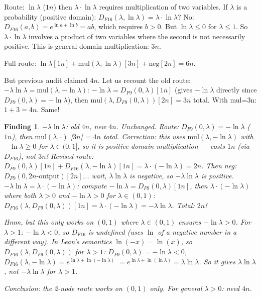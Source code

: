 \documentclass[11pt]{article}
\newtheorem{finding}[theorem]{Finding}
\newcommand{\ok}[1]{\textcolor{ok}{#1}}
\begin{document}
Route: $\ln \lambda$ ($1n$) then $\lambda \cdot \ln \lambda$ requires multiplication of two variables.
If $\lambda$ is a probability (positive domain): $D_{F16}(\lambda, \ln\lambda) = \lambda \cdot \ln\lambda$?
No: $D_{F16}(a,b) = e^{\ln a + \ln b} = ab$, which requires $b > 0$. But $\ln\lambda \leq 0$ for $\lambda \leq 1$.
So $\lambda \cdot \ln\lambda$ involves a product of two variables where the second is not necessarily positive.
This is general-domain multiplication: $3n$.

Full route: $\ln\lambda[1n] + \mathrm{mul}(\lambda, \ln\lambda)[3n] + \mathrm{neg}[2n] = 6n$.

But previous audit claimed $4n$. Let us recount the old route:
$-\lambda\ln\lambda = \mathrm{mul}(\lambda, -\ln\lambda)$: $-\ln\lambda = D_{F9}(0,\lambda)[1n]$ (gives $-\ln\lambda$ directly since $D_{F9}(0,\lambda) = -\ln\lambda$), then $\mathrm{mul}(\lambda, D_{F9}(0,\lambda))[2n] = 3n$ total. With mul=3n: $1+3 = 4n$. \ok{Same!}

\begin{finding}
$-\lambda\ln\lambda$: old $4n$, new $4n$. \ok{Unchanged.}
Route: $D_{F9}(0,\lambda) = -\ln\lambda$ ($1n$), then $\mathrm{mul}(\lambda, \cdot)$ [$3n$] = $4n$ total.
Correction: this uses $\mathrm{mul}(\lambda, -\ln\lambda)$ with $-\ln\lambda \geq 0$ for $\lambda \in (0,1]$,
so it \emph{is} positive-domain multiplication --- costs $1n$ (via $D_{F16}$), not $3n$!
Revised route: $D_{F9}(0,\lambda)[1n] + D_{F16}(\lambda, -\ln\lambda)[1n] = \lambda \cdot (-\ln\lambda) = 2n$.
Then neg: $D_{F9}(0, 2n\text{-output})[2n]$... wait, $\lambda \ln\lambda$ is negative, so $-\lambda\ln\lambda$ is positive.
$-\lambda\ln\lambda = \lambda \cdot (-\ln\lambda)$: compute $-\ln\lambda = D_{F9}(0,\lambda)[1n]$,
then $\lambda \cdot (-\ln\lambda)$ where both $\lambda > 0$ and $-\ln\lambda > 0$ for $\lambda \in (0,1)$:
$D_{F16}(\lambda, D_{F9}(0,\lambda))[1n] = \lambda \cdot (-\ln\lambda) = -\lambda\ln\lambda$.
Total: $2n$!

Hmm, but this only works on $(0,1)$ where $\lambda \in (0,1)$ ensures $-\ln\lambda > 0$.
For $\lambda > 1$: $-\ln\lambda < 0$, so $D_{F16}$ is undefined (uses $\ln$ of a negative number
in a different way). In Lean's semantics $\ln(-x) = \ln(x)$, so $D_{F16}(\lambda, D_{F9}(0,\lambda))$
for $\lambda > 1$: $D_{F9}(0,\lambda) = -\ln\lambda < 0$, $D_{F16}(\lambda, -\ln\lambda) = e^{\ln\lambda + \ln(-\ln\lambda)}$
$= e^{\ln\lambda + \ln(\ln\lambda)} = \lambda \ln\lambda$. So it gives $\lambda\ln\lambda$, not $-\lambda\ln\lambda$ for $\lambda > 1$.

Conclusion: the 2-node route works on $(0,1)$ only. For general $\lambda > 0$: need $4n$.
\end{finding}
\end{document}
